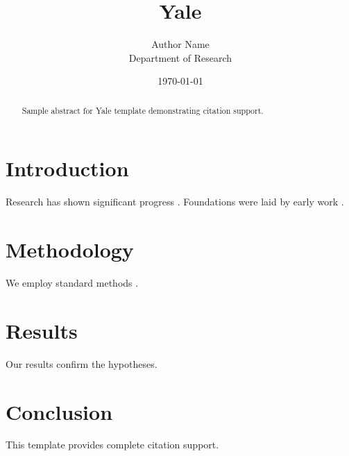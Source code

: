 \documentclass{thesis_yale}
\title{Yale}
\author{Author Name \\ \small Department of Research}
\date{\today}
\begin{document}
\maketitle

\begin{abstract}
Sample abstract for Yale template demonstrating citation support.
\end{abstract}

\section{Introduction}
Research has shown significant progress \citep{einstein1905}. Foundations were laid by early work \citep{turing1950}.

\section{Methodology}
We employ standard methods \citep{knuth1984}.

\section{Results}
Our results confirm the hypotheses.

\section{Conclusion}
This template provides complete citation support.



\end{document}
